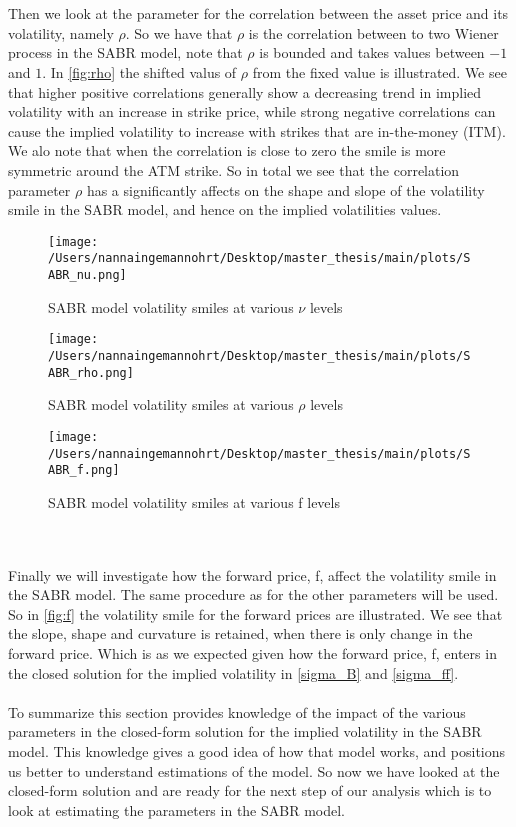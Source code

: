 \\\\
Then we look at the parameter for the correlation between the asset price and its volatility, namely $\rho$.
So we have that $\rho$ is the correlation between to two Wiener process in the SABR model, note
that $\rho$ is bounded and takes values between $-1$ and $1$. In \autoref{fig:rho} the shifted valus of $\rho$
from the fixed value is illustrated. 
We see that higher positive correlations generally show a decreasing trend in implied volatility with an increase in strike price, 
while strong negative correlations can cause the implied volatility to increase with strikes that are in-the-money (ITM).
We alo note that when the correlation is close to zero the smile is more symmetric around the ATM strike. 
So in total we see that the correlation parameter $\rho$ has a significantly affects on the shape and slope of
the volatility smile in the SABR model, and hence on the implied volatilities values.
\begin{figure}[H]
    \centering
    \texttt{[image: /Users/nannaingemannohrt/Desktop/master\_thesis/main/plots/SABR\_nu.png]}
    \caption{SABR model volatility smiles at various $\nu$ levels}
    \label{fig:nu}
\end{figure}

\begin{figure}[H]
    \centering
    \texttt{[image: /Users/nannaingemannohrt/Desktop/master\_thesis/main/plots/SABR\_rho.png]}
    \caption{SABR model volatility smiles at various $\rho$ levels}
    \label{fig:rho}
\end{figure}

\begin{figure}[H]
    \centering
    \texttt{[image: /Users/nannaingemannohrt/Desktop/master\_thesis/main/plots/SABR\_f.png]}
    \caption{SABR model volatility smiles at various f levels}
    \label{fig:f}
\end{figure}
\noindent
\\\\
Finally we will investigate how the forward price, f, affect the volatility smile in the SABR model. 
The same procedure as for the other parameters will be used. So in \autoref{fig:f} the volatility smile
for the forward prices are illustrated. We see that the slope, shape and curvature is retained, when there
is only change in the forward price. Which is as we expected given how the forward price, f, enters in the closed
solution for the implied volatility in \autoref{sigma_B} and \autoref{sigma_ff}.
\\\\
To summarize this section provides knowledge of the impact of the various parameters in the closed-form solution
for the implied volatility in the SABR model. This knowledge gives a good idea of how that model works, and 
positions us better to understand estimations of the model. So now we have looked at the closed-form solution and 
are ready for the next step of our analysis which is to look at  estimating the parameters in the SABR model.
\newpage
